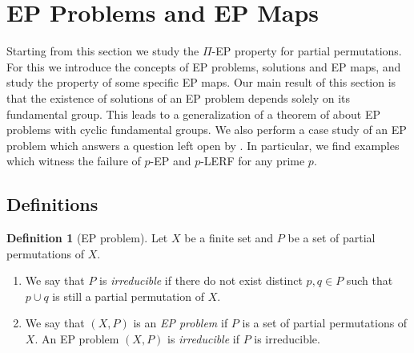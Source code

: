 \documentclass[11pt]{amsart}
\theoremstyle{definition}
\newtheorem{definition}[theorem]{Definition}
\theoremstyle{definition}
\numberwithin{equation}{section}
\begin{document}




























































\section{EP Problems and EP Maps}

Starting from this section we study the $\Pi$-EP property for partial permutations. For this we introduce the concepts of EP problems, solutions and EP maps,  and study the property of some specific EP maps. Our main result of this section is that the existence of solutions of an EP problem depends solely on its fundamental group. This leads to a generalization of a theorem of \cite{HPSW19} about EP problems with cyclic fundamental groups. We also perform a case study of an EP problem which answers a question left open by \cite{HPSW19}. In particular, we find examples which witness the failure of $p$-EP and $p$-LERF for any prime $p$.

\subsection{Definitions\label{subsec:EPproblem}}

\begin{definition}[EP problem]\label{def:EPproblem} Let $X$ be a finite set and $P$ be a set of partial permutations of $X$.
\begin{enumerate}
\item[(1)] We say that $P$ is {\em irreducible} if there do not exist distinct $p, q\in P$ such that $p\cup q$ is still a partial permutation of $X$.
\item[(2)] We say that $(X, P)$ is an {\em EP problem} if $P$ is a set of partial permutations of $X$. An EP problem $(X, P)$ is {\em irreducible} if $P$ is irreducible.
\end{enumerate}
\end{definition}
\end{document}
